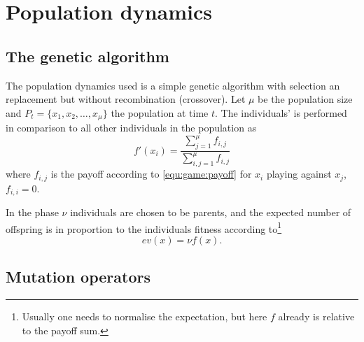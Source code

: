 \section{Population dynamics}\label{sec:genetic}

\subsection{The genetic algorithm}
The population dynamics used is a simple genetic algorithm with selection an replacement but without recombination (crossover). Let $\mu$ be the population size and $P_{t} = \{x_1, x_2, \dots, x_\mu\}$ the population at time $t$. The individuals'  is performed in comparison to all other individuals in the population as
\begin{equation*}
f'(x_i) = \frac{\sum_{j = 1}^\mu f_{i,j}}{\sum_{i,j = 1}^\mu f_{i, j}}
\end{equation*}
where $f_{i, j}$ is the payoff according to \ref{equ:game:payoff} for $x_i$ playing against $x_j$, $f_{i,i} = 0$.


In the  phase $\nu$ individuals are chosen to be parents, and the expected number of offspring is in proportion to the individuals fitness according to\footnote{Usually one needs to normalise the expectation, but here $f$ already is relative to the payoff sum.}
\begin{equation*}
ev(x) = \nu f(x).
\end{equation*}


\subsection{Mutation operators}

